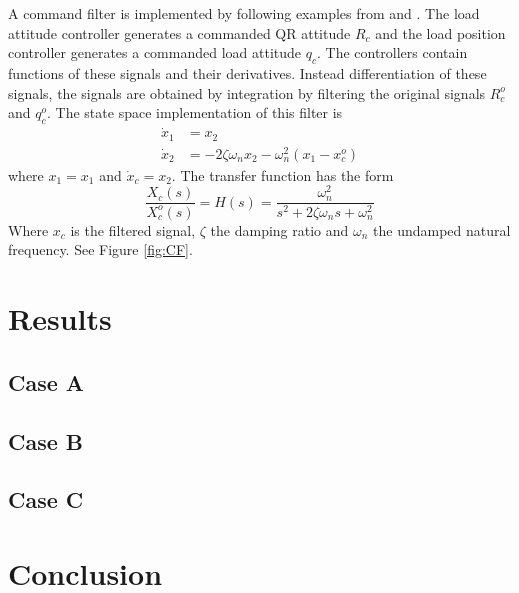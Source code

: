 A command filter is implemented by following examples from \cite{Farrell2008} and \cite{Djapic2008}. The load attitude controller generates a commanded QR attitude $ R_c $ and the load position controller generates a commanded load attitude $ q_c $. The controllers contain functions of these signals and their derivatives. Instead differentiation of these signals, the signals are obtained by integration by filtering the original signals $ R_c^o $ and $ q_c^o $. The state space implementation of this filter is \cite{Djapic2008}
\begin{align}\label{key}
\dot{x}_1 &= x_2\\
\dot{x}_2 &= -2\zeta\omega_nx_2-\omega_n^2(x_1-x_c^o)
\end{align}
where $ x_1 = x_1$ and $ \dot{x}_c = x_2 $. The transfer function has the form
\begin{equation}\label{key}
\frac{X_c(s)}{X_c^o(s)}=H(s)=\frac{\omega_n^2}{s^2+2\zeta\omega_ns+\omega_n^2}
\end{equation}
Where $ x_c $ is the filtered signal, $ \zeta $ the damping ratio and $ \omega_n $ the undamped natural frequency. See Figure \ref{fig:CF}.

\section{Results}
\subsection{Case A}
\subsection{Case B}
\subsection{Case C}


\section{Conclusion}

